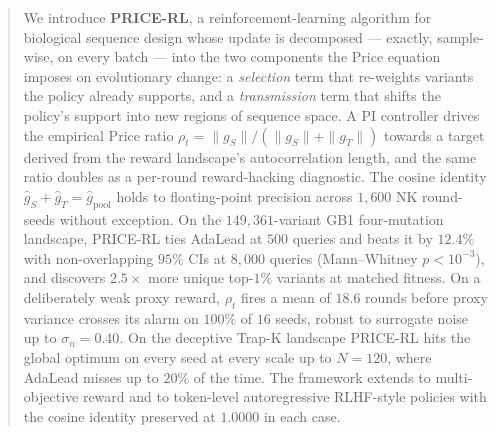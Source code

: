 \documentclass{article}
\begin{document}

\printAffiliationsAndNotice{}

\begin{abstract}
We introduce \textbf{PRICE-RL}, a reinforcement-learning algorithm for biological sequence design whose update is decomposed --- exactly, sample-wise, on every batch --- into the two components the Price equation imposes on evolutionary change: a \emph{selection} term that re-weights variants the policy already supports, and a \emph{transmission} term that shifts the policy's support into new regions of sequence space. A PI controller drives the empirical Price ratio $\rho_t = \|g_S\|/(\|g_S\|+\|g_T\|)$ towards a target derived from the reward landscape's autocorrelation length, and the same ratio doubles as a per-round reward-hacking diagnostic. The cosine identity $\hat g_S + \hat g_T = \hat g_{\mathrm{pool}}$ holds to floating-point precision across $1{,}600$ NK round-seeds without exception. On the $149{,}361$-variant GB1 four-mutation landscape, PRICE-RL ties AdaLead at $500$ queries and beats it by $12.4\%$ with non-overlapping $95\%$ CIs at $8{,}000$ queries (Mann--Whitney $p<10^{-3}$), and discovers $2.5\times$ more unique top-$1\%$ variants at matched fitness. On a deliberately weak proxy reward, $\rho_t$ fires a mean of $18.6$ rounds before proxy variance crosses its alarm on $100\%$ of $16$ seeds, robust to surrogate noise up to $\sigma_n = 0.40$. On the deceptive Trap-K landscape PRICE-RL hits the global optimum on every seed at every scale up to $N=120$, where AdaLead misses up to $20\%$ of the time. The framework extends to multi-objective reward and to token-level autoregressive RLHF-style policies with the cosine identity preserved at $1.0000$ in each case.
\end{abstract}












\appendix
\onecolumn

\end{document}
